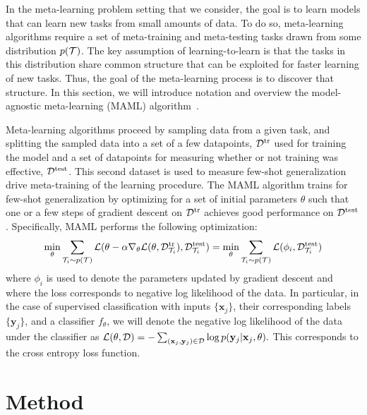 \documentclass{article}
\begin{document}
In the meta-learning problem setting that we consider, the goal is to learn models that can learn new tasks from small amounts of data. To do so, meta-learning algorithms require a set
of meta-training and meta-testing tasks drawn from some distribution $p(\mathcal{T})$. The key assumption of learning-to-learn is that the tasks in this distribution share common structure that can be exploited for faster learning of new tasks. Thus, the goal of the meta-learning process is to discover that structure.
In this section, we will introduce notation and overview the model-agnostic meta-learning (MAML) algorithm~\cite{finn2017model}. 

Meta-learning algorithms proceed by sampling data from a given task, and splitting the sampled data into a set of a few datapoints, $\mathcal{D}^\text{tr}$ used for training the model and a set of datapoints for measuring whether or not training was effective, $\mathcal{D}^\text{test}$. This second dataset is used to measure few-shot generalization drive meta-training of the learning procedure. The MAML algorithm trains for few-shot generalization by optimizing for a set of initial parameters $\theta$ such that one or a few steps of gradient descent on $\mathcal{D}^\text{tr}$ achieves good performance on $\mathcal{D}^\text{test}$. Specifically, MAML performs the following optimization:
\begin{align*}
\min_\theta \sum_{\mathcal{T}_i \sim p(\mathcal{T})} \mathcal{L}(\theta-\alpha \nabla_\theta \mathcal{L}(\theta, \mathcal{D}^\text{tr}_{\mathcal{T}_i}), \mathcal{D}^\text{test}_{\mathcal{T}_i}) 
= \min_\theta \sum_{\mathcal{T}_i \sim p(\mathcal{T})} \mathcal{L}(\phi_i, \mathcal{D}^\text{test}_{\mathcal{T}_i})
\end{align*}
where $\phi_i$ is used to denote the parameters updated by gradient descent and where the loss corresponds to negative log likelihood of the data. In particular, in the case of supervised classification with inputs $\{\mathbf{x}_j\}$, their corresponding labels $\{\mathbf{y}_j\}$, and a classifier $f_\theta$, we will denote the negative log likelihood of the data under the classifier as 
$
\mathcal{L}(\theta, \mathcal{D})=-\sum_{(\mathbf{x}_j,\mathbf{y}_j)\in\mathcal{D}} \log p(\mathbf{y}_j | \mathbf{x}_j, \theta).
$
This corresponds to the cross entropy loss function.

 
\vspace{-0.3cm}
\section{Method}
\label{sec:method}
\vspace{-0.2cm}
\end{document}
